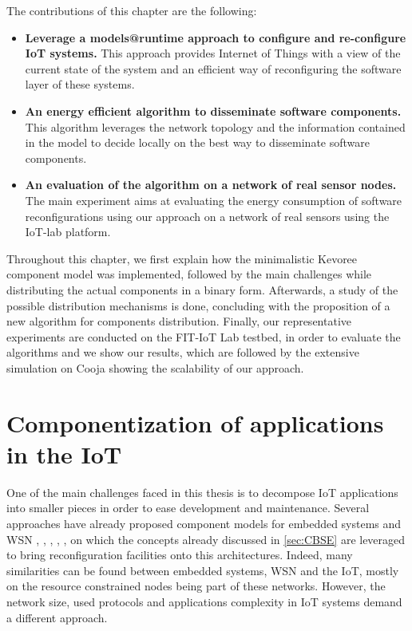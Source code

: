 The contributions of this chapter are the following:
\begin{itemize}
	\item \textbf{Leverage a models@runtime approach to configure and re-configure IoT systems.} This approach provides Internet of Things with a view of the current state of the  system and an efficient way of reconfiguring the software layer of these systems.
	\item \textbf{An energy efficient algorithm to disseminate software components.} This algorithm leverages the network topology and the information contained in the model to decide locally on the best way to disseminate software components.
	\item \textbf{An evaluation of the algorithm on a network of real sensor nodes.} The main experiment aims at evaluating the energy consumption of software reconfigurations using our approach on a network of real sensors using the IoT-lab platform.
\end{itemize}

Throughout this chapter, we first explain how the minimalistic Kevoree component model was implemented, followed by the main challenges while distributing the actual components in a binary form.
Afterwards, a study of the possible distribution mechanisms is done, concluding with the proposition of a new algorithm for components distribution.
Finally, our representative experiments are conducted on the FIT-IoT Lab testbed, in order to evaluate the algorithms and we show our results, which are followed by the extensive simulation on Cooja showing the scalability of our approach.


\section{Componentization of applications in the IoT}
One of the main challenges faced in this thesis is to decompose IoT applications into smaller pieces in order to ease development and maintenance.
Several approaches have already proposed component models for embedded systems\cite{friedrich2001survey} and WSN \cite{marron2006flexcup}, \cite{grace2004gridkit}, \cite{mottola2008figaro}, \cite{cid2012looci}, \cite{taherkordi2013optimizing}, on which the concepts already discussed in \ref{sec:CBSE} are leveraged to bring reconfiguration facilities onto this architectures.
Indeed, many similarities can be found between embedded systems, WSN and the IoT, mostly on the resource constrained nodes being part of these networks.
However, the network size, used protocols and applications complexity in IoT systems demand a different approach.

